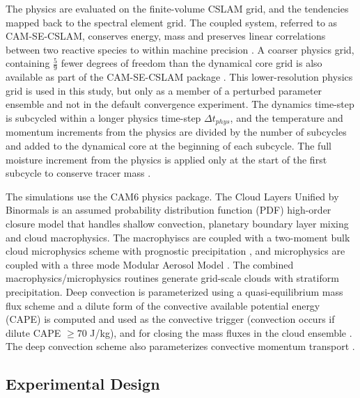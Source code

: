 \documentclass[times]{qjrms4}
\begin{document}
The physics are evaluated on the finite-volume CSLAM grid, and the tendencies mapped back to the spectral element grid. The coupled system, referred to as CAM-SE-CSLAM, conserves energy, mass and preserves linear correlations between two reactive species to within machine precision \citep{HL2018MWR}. A coarser physics grid, containing $\frac{5}{9}$ fewer degrees of freedom than the dynamical core grid is also available as part of the CAM-SE-CSLAM package \citep{HETAL2019JAMES}. This lower-resolution physics grid is used in this study, but only as a member of a perturbed parameter ensemble and not in the default convergence experiment. The dynamics time-step is subcycled within a longer physics time-step $\Delta t_{phys}$, and the temperature and momentum increments from the physics are divided by the number of subcycles and added to the dynamical core at the beginning of each subcycle. The full moisture increment from the physics is applied only at the start of the first subcycle to conserve tracer mass \citep[$ftype=2$ option in][]{LetAl2018JAMES}.

The simulations use the CAM6 physics package. The Cloud Layers Unified by Binormals \citep[CLUBB][]{GETAL2002JAS,BOG2013JCLIM} is an assumed probability distribution function (PDF) high-order closure model that handles shallow convection, planetary boundary layer mixing and cloud macrophysics. The macrophyiscs are coupled with a two-moment bulk cloud microphysics scheme with prognostic precipitation \citep{MG2}, and microphysics are coupled with a three mode Modular Aerosol Model \citep{MAM}. The combined macrophysics/microphysics routines generate grid-scale clouds with stratiform precipitation. Deep convection is parameterized using a quasi-equilibrium mass flux scheme \citep{ZM1995AO} and a dilute form of the convective available potential energy (CAPE) is computed and used as the convective trigger (convection occurs if dilute CAPE $\geq 70$ J/kg), and for closing the mass fluxes in the cloud ensemble \citep{NRJ2008JC}. The deep convection scheme also parameterizes convective momentum transport \citep{RR2008JC}.

\subsection{Experimental Design}
 
\end{document}
